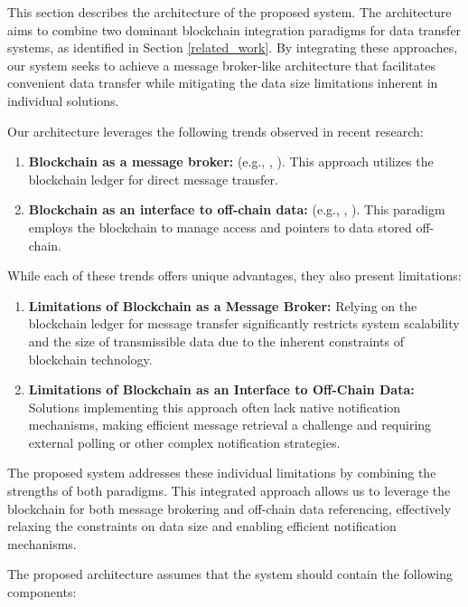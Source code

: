 \documentclass[10pt]{llncs}
\begin{document}
This section describes the architecture of the proposed system. 
The architecture aims to combine two dominant blockchain integration paradigms for data transfer systems, as identified in Section \ref{related_work}. 
By integrating these approaches, our system seeks to achieve a message broker-like architecture that facilitates convenient data transfer while mitigating the data size limitations inherent in individual solutions.

Our architecture leverages the following trends observed in recent research:

\begin{enumerate}
    \item \textbf{Blockchain as a message broker:} (e.g., \cite{Ghaemi2021}, \cite{kim2020hybrid}). This approach utilizes the blockchain ledger for direct message transfer.
    \item \textbf{Blockchain as an interface to off-chain data:} (e.g., \cite{Jia2023}, \cite{Wang2024}). This paradigm employs the blockchain to manage access and pointers to data stored off-chain.
\end{enumerate}

While each of these trends offers unique advantages, they also present limitations:

\begin{enumerate}
    \item \textbf{Limitations of Blockchain as a Message Broker:} Relying on the blockchain ledger for message transfer significantly restricts system scalability and the size of transmissible data due to the inherent constraints of blockchain technology.

    \item \textbf{Limitations of Blockchain as an Interface to Off-Chain Data:} Solutions implementing this approach often lack native notification mechanisms, making efficient message retrieval a challenge and requiring external polling or other complex notification strategies.
\end{enumerate}

The proposed system addresses these individual limitations by combining the strengths of both paradigms. 
This integrated approach allows us to leverage the blockchain for both message brokering and off-chain data referencing, effectively relaxing the constraints on data size and enabling efficient notification mechanisms. 

The proposed architecture assumes that the system should contain the following components:
\end{document}
